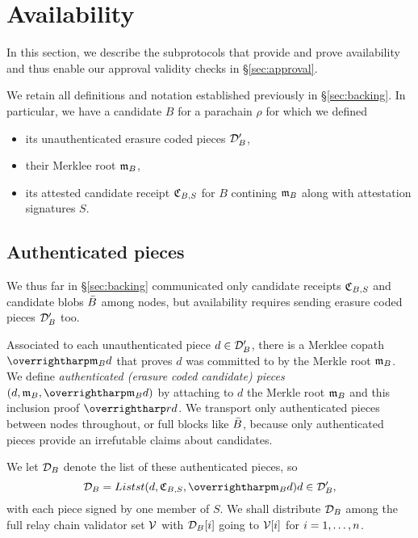 
\section{Availability}
\label{sec:availability}


In this section, we describe the subprotocols that provide and prove availability and thus enable our approval validity checks in \S\ref{sec:approval}.  

We retain all definitions and notation established previously in \S\ref{sec:backing}.  In particular, we have a candidate $B$ for a parachain $\rho$ for which we defined
\begin{itemize}
\item its unauthenticated erasure coded pieces $\mathcal{D}'_B$,
\item their Merklee root $\mathfrak{m}_B$, 
\item its attested candidate receipt $\mathfrak{C}_{B,S}$ for $B$ contining $\mathfrak{m}_B$ along with attestation signatures $S$.
\end{itemize}


\subsection{Authenticated pieces}
\label{sec:authenticated_pieces}

We thus far in \S\ref{sec:backing} communicated only candidate receipts $\mathfrak{C}_{B,S}$ and candidate blobs $\bar{B}$ among nodes, but availability requires sending erasure coded pieces $\mathcal{D}'_B$ too.

Associated to each unauthenticated piece $d \in \mathcal{D}'_B$, there is a Merklee copath $\vect{\merkleroot_B d}$ that proves $d$ was committed to by the Merkle root $\mathfrak{m}_B$.  
We define {\em authenticated (erasure coded candidate) pieces} $(d,\merkleroot_B,\vect{\merkleroot_B d})$ by attaching to $d$ the Merkle root $\mathfrak{m}_B$ and this inclusion proof $\vect{rd}$.  
We transport only authenticated pieces between nodes throughout, or full blocks like $\bar{B}$, because only authenticated pieces provide an irrefutable claims about candidates. 

We let $\mathcal{D}_B$ denote the list of these authenticated pieces, so
$$ \pieces_B = Listst{ (d,\receipt_{B,S},\vect{\merkleroot_B d}) }{ d \in \prepieces_B } \mathcomma $$
with each piece signed by one member of $S$.  
%
We shall distribute $\mathcal{D}_B$ among the full relay chain validator set $\mathcal{V}$ with $\mathcal{D}_B[i]$ going to $\mathcal{V}[i]$ for $i = 1,\ldots,n$.  

